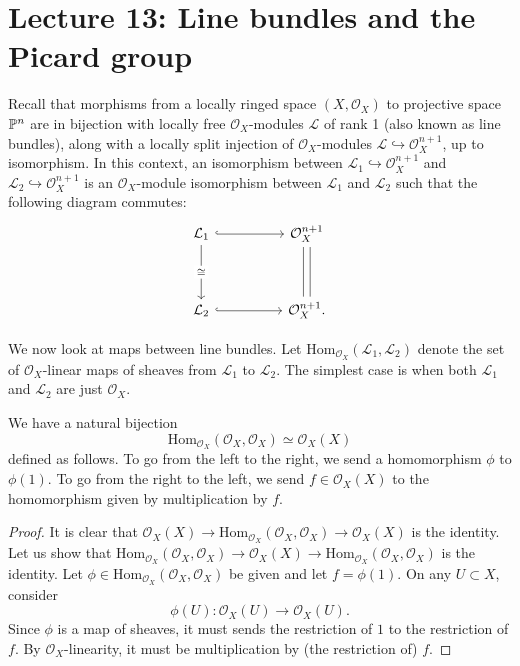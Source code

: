 \newpage

\section*{Lecture 13: Line bundles and the Picard group}
Recall that morphisms from a locally ringed space $(X, \mathcal{O}_X)$ to projective space $\P^n$ are in bijection with locally free $\mathcal{O}_X$-modules $\mathcal{L}$ of rank 1 (also known as line bundles), along with a locally split injection of $\mathcal{O}_X$-modules $\mathcal{L} \hookrightarrow \mathcal{O}_X^{n+1}$, up to isomorphism. In this context, an isomorphism between $\mathcal{L}_1 \hookrightarrow \mathcal{O}_X^{n+1}$ and $\mathcal{L}_2 \hookrightarrow \mathcal{O}_X^{n+1}$ is an $\mathcal{O}_X$-module isomorphism between $\mathcal{L}_1$ and $\mathcal{L}_2$ such that the following diagram commutes: 
\[
\begin{tikzcd}
    \mathcal{L}_1  && \mathcal{O}_X^{n+1} \\
    \\
    \mathcal{L}_2 && \mathcal{O}_X^{n+1}.
    \arrow[hook, from=1-1, to=1-3]
    \arrow[hook, from=3-1, to=3-3]
    \arrow["\cong"{description}, from=1-1, to=3-1]
    \arrow[shift right, no head, from=1-3, to=3-3]
	\arrow[shift left, no head, from=1-3, to=3-3]
\end{tikzcd}
\]

We now look at maps between line bundles. Let $\mathrm{Hom}_{\mathcal{O}_X}(\mathcal{L}_1, \mathcal{L}_2)$ denote the set of $\mathcal{O}_X$-linear maps of sheaves from $\mathcal{L}_1$ to $\mathcal{L}_2$. The simplest case is when both $\mathcal{L}_1$ and $\mathcal{L}_2$ are just $\mathcal{O}_X$.
\begin{proposition}
  We have a natural bijection
  \[ \mathrm{Hom}_{\mathcal{O}_X}(\mathcal{O}_X, \mathcal{O}_X) \simeq \mathcal{O}_X(X)\]
  defined as follows.
  To go from the left to the right, we send a homomorphism \(\phi\) to \(\phi(1)\).
  To go from the right to the left, we send \(f \in \mathcal{O}_X(X)\) to the homomorphism given by multiplication by \(f\).
\end{proposition}
\begin{proof}
  It is clear that \(\mathcal{O}_X(X) \to \mathrm{Hom}_{\mathcal{O}_X}(\mathcal{O}_X, \mathcal{O}_X) \to \mathcal{O}_X(X)\) is the identity.
  Let us show that \(\mathrm{Hom}_{\mathcal{O}_X}(\mathcal{O}_X, \mathcal{O}_X) \to \mathcal{O}_X(X) \to \mathrm{Hom}_{\mathcal{O}_X}(\mathcal{O}_X, \mathcal{O}_X)\) is the identity.
  Let \(\phi \in \mathrm{Hom}_{\mathcal{O}_X}(\mathcal{O}_X, \mathcal{O}_X)\) be given and let \(f = \phi(1)\).
  On any \(U \subset X\), consider 
  \[\phi(U) \colon \mathcal{O}_X(U) \to \mathcal{O}_X(U).\]
  Since \(\phi\) is a map of sheaves, it must sends the restriction of \(1\) to the restriction of \(f\).
  By \(\mathcal{O}_X\)-linearity, it must be multiplication by (the restriction of) \(f\).
\end{proof}

